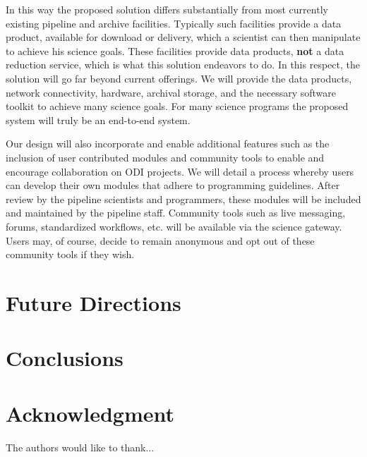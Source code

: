 \documentclass[10pt,conference]{IEEEtran}
\begin{document}
In this way the proposed solution differs substantially from most currently existing pipeline and archive facilities. Typically such facilities provide a data product, available for download or delivery, which a scientist can then manipulate to achieve his science goals. These facilities provide data products, {\bf not} a data reduction service, which is what this solution endeavors to do. In this respect, the solution will go far beyond current offerings. We will provide the data products, network connectivity, hardware, archival storage, and the necessary software toolkit to achieve many science goals. For many science programs the proposed system will truly be an end-to-end system.

Our design will also incorporate and enable additional features such as the inclusion of user contributed modules and community tools to enable and encourage collaboration on ODI projects. We will detail a process whereby users can develop their own modules that adhere to programming guidelines. After review by the pipeline scientists and programmers, these modules will be included and maintained by the pipeline staff. Community tools such as live messaging, forums, standardized workflows, etc. will be available via the science gateway. Users may, of course, decide to remain anonymous and opt out of these community tools if they wish. 

\section{Future Directions}\label{sec:future}

\section{Conclusions}\label{sec:conclusions}


\section*{Acknowledgment}

The authors would like to thank... \cite{simms2007}





\end{document}
